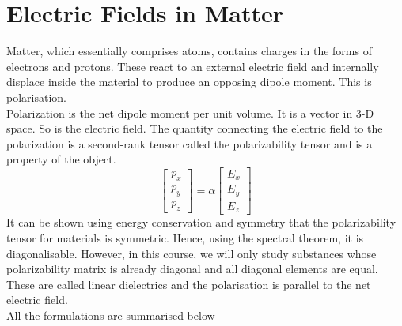 \documentclass[12pt, oneside]{book}
\begin{document}
\section{Electric Fields in Matter}
Matter, which essentially comprises atoms, contains charges in the forms of electrons and protons. These react to an external electric field and internally displace inside the material to produce an opposing dipole moment. This is polarisation. \\
Polarization is the net dipole moment per unit volume. It is a vector in 3-D space. So is the electric field. The quantity connecting the electric field to the polarization is a second-rank tensor called the polarizability tensor and is a property of the object.
\begin{equation}
    \begin{bmatrix}
        p_x\\
        p_y\\
        p_z 
    \end{bmatrix}
     = \alpha
     \begin{bmatrix}
        E_x\\
        E_y\\
        E_z
     \end{bmatrix}
\end{equation}
It can be shown using energy conservation and symmetry that the polarizability tensor for materials is symmetric. Hence, using the spectral theorem, it is diagonalisable. However, in this course, we will only study substances whose polarizability matrix is already diagonal and all diagonal elements are equal. These are called linear dielectrics and the polarisation is parallel to the net electric field. \\

All the formulations are summarised below
\end{document}
